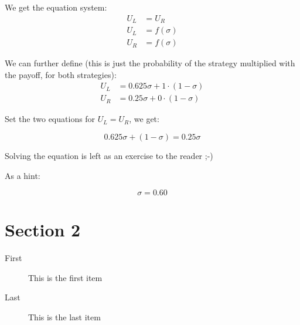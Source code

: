 \documentclass[DIV=calc, paper=a4, fontsize=11pt, twocolumn]{scrartcl}	 %
\begin{document}
We get the equation system:
$$\begin{align*}
  U_L &= U_R\\
  U_L &= f(\sigma)\\
  U_R &= f(\sigma)
\end{align*}$$

We can further define (this is just the probability
of the strategy multiplied with the payoff, for both
strategies):
$$\begin{align*}
  U_L &= 0.625\sigma + 1 \cdot (1-\sigma)\\
  U_R &= 0.25\sigma + 0 \cdot (1-\sigma)
\end{align*}$$

Set the two equations for $U_L = U_R$, we get:

$$  0.625\sigma + (1-\sigma) =  0.25\sigma$$

Solving the equation is left as an exercise to the reader ;-)

As a hint:

$$\sigma = 0.60$$


\section*{Section 2}


\begin{description}
\item[First] This is the first item
\item[Last] This is the last item
\end{description}

\nocite{Albizu2013}



\end{document}

